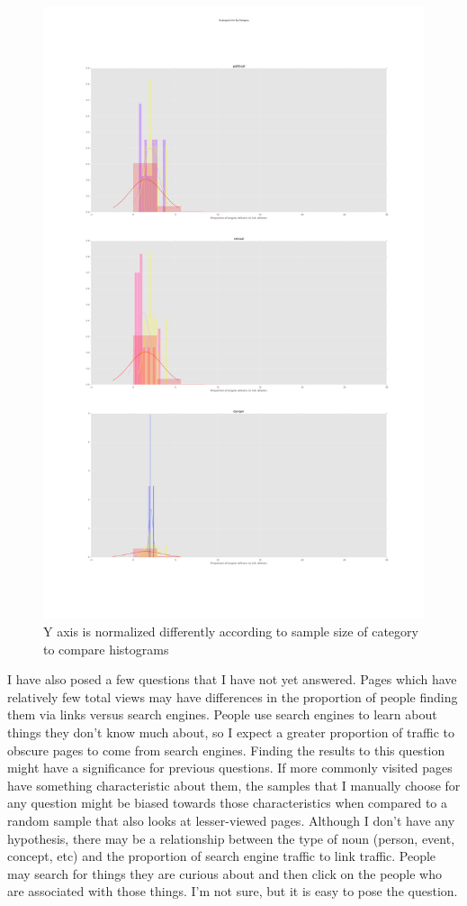 \documentclass{article}
\begin{document}
\begin{figure}
    \includegraphics[width=\textwidth]{results/Clickbait_Engines_Links_By-Category.pdf}
    \caption{Y axis is normalized differently according to sample size of category to compare histograms} \label{fig:clickbait}
\end{figure}


I have also posed a few questions that I have not yet answered. Pages which have relatively few total views may have differences in the proportion of people finding them via links versus search engines. People use search engines to learn about things they don’t know much about, so I expect a greater proportion of traffic to obscure pages to come from search engines. Finding the results to this question might have a significance for previous questions. If more commonly visited pages have something characteristic about them, the samples that I manually choose for any question might be biased towards those characteristics when compared to a random sample that also looks at lesser-viewed pages. Although I don’t have any hypothesis, there may be a relationship between the type of noun (person, event, concept, etc) and the proportion of search engine traffic to link traffic. People may search for things they are curious about and then click on the people who are associated with those things. I’m not sure, but it is easy to pose the question.
\end{document}

